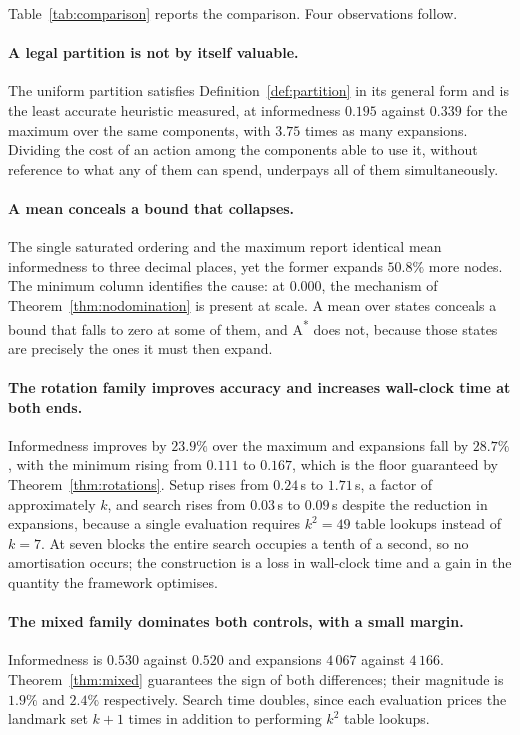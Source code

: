\documentclass[10pt,twocolumn,a4paper]{article}
\theoremstyle{plain}
\theoremstyle{definition}
\theoremstyle{remark}
\begin{document}
Table~\ref{tab:comparison} reports the comparison. Four observations follow.

\paragraph{A legal partition is not by itself valuable.}
The uniform partition satisfies Definition~\ref{def:partition} in its general
form and is the least accurate heuristic measured, at informedness $0.195$
against $0.339$ for the maximum over the same components, with $3.75$ times as
many expansions. Dividing the cost of an action among the components able to
use it, without reference to what any of them can spend, underpays all of them
simultaneously.

\paragraph{A mean conceals a bound that collapses.}
The single saturated ordering and the maximum report identical mean
informedness to three decimal places, yet the former expands $50.8\%$ more
nodes. The minimum column identifies the cause: at $0.000$, the mechanism of
Theorem~\ref{thm:nodomination} is present at scale. A mean over states conceals
a bound that falls to zero at some of them, and A\textsuperscript{*} does not,
because those states are precisely the ones it must then expand.

\paragraph{The rotation family improves accuracy and increases wall-clock time
at both ends.}
Informedness improves by $23.9\%$ over the maximum and expansions fall by
$28.7\%$, with the minimum rising from $0.111$ to $0.167$, which is the floor
guaranteed by Theorem~\ref{thm:rotations}. Setup rises from $0.24$\,s to
$1.71$\,s, a factor of approximately $k$, and search rises from $0.03$\,s to
$0.09$\,s despite the reduction in expansions, because a single evaluation
requires $k^2 = 49$ table lookups instead of $k = 7$. At seven blocks the
entire search occupies a tenth of a second, so no amortisation occurs; the
construction is a loss in wall-clock time and a gain in the quantity the
framework optimises.

\paragraph{The mixed family dominates both controls, with a small margin.}
Informedness is $0.530$ against $0.520$ and expansions $4\,067$ against
$4\,166$. Theorem~\ref{thm:mixed} guarantees the sign of both differences;
their magnitude is $1.9\%$ and $2.4\%$ respectively. Search time doubles, since
each evaluation prices the landmark set $k+1$ times in addition to performing
$k^2$ table lookups.
\end{document}
